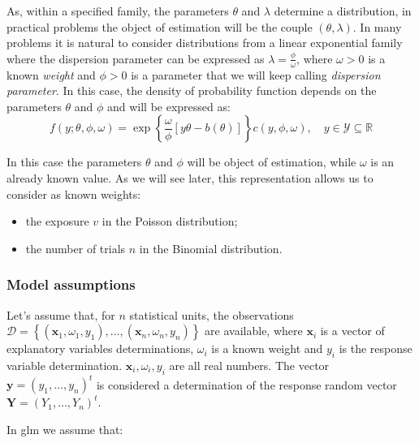 \documentclass[a4paper, twoside, openright, 12pt]{report}
\providecommand{\tightlist}{%
  \setlength{\itemsep}{0pt}\setlength{\parskip}{0pt}}
\theoremstyle{definition}
\theoremstyle{definition}
\theoremstyle{definition}
\theoremstyle{remark}
\begin{document}
As, within a specified family, the parameters \(\theta\) and \(\lambda\) determine a distribution, in practical problems the object of estimation will be the couple \((\theta, \lambda)\). In many problems it is natural to consider distributions from a linear exponential family where the dispersion parameter can be expressed as \(\lambda = \frac{\phi}{\omega}\), where \(\omega>0\) is a known \emph{weight} and \(\phi>0\) is a parameter that we will keep calling \emph{dispersion parameter}. In this case, the density of probability function depends on the parameters \(\theta\) and \(\phi\) and will be expressed as:
\[
f(y; \theta, \phi, \omega) = \exp{\left\{ \frac{\omega}{\phi} \left[y\theta - b(\theta) \right] \right\}} c(y, \phi, \omega), \quad y\in \mathcal{Y}\subseteq\mathbb{R}
\]

In this case the parameters \(\theta\) and \(\phi\) will be object of estimation, while \(\omega\) is an already known value. As we will see later, this representation allows us to consider as known weights:

\begin{itemize}
\tightlist
\item
  the exposure \(v\) in the Poisson distribution;
\item
  the number of trials \(n\) in the Binomial distribution.
\end{itemize}

\hypertarget{chap:glm-assumptions}{%
\subsubsection{Model assumptions}\label{chap:glm-assumptions}}

Let's assume that, for \(n\) statistical units, the observations \(\mathcal{D} = \left\{ (\boldsymbol{x}_1, \omega_1, y_1), \dots, (\boldsymbol{x}_n, \omega_n, y_n) \right\}\) are available, where \(\boldsymbol{x}_i\) is a vector of explanatory variables determinations, \(\omega_i\) is a known weight and \(y_i\) is the response variable determination. \(\boldsymbol{x}_i, \omega_i, y_i\) are all real numbers. The vector \(\boldsymbol{y} = (y_1, \dots, y_n)^t\) is considered a determination of the response random vector \(\boldsymbol{Y} = (Y_1, \dots, Y_n)^t\).

In \ac{glm} we assume that:
\end{document}
